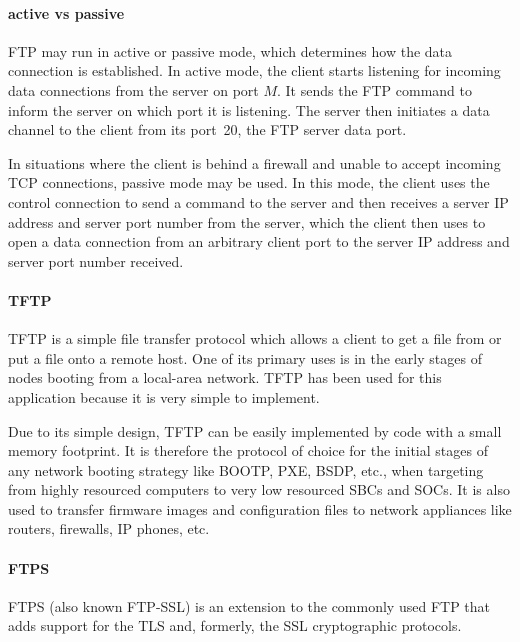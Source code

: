 \paragraph{active vs passive}
\acs{FTP} may run in active or passive mode, which determines how the data connection is established.
In active mode, the client starts listening for incoming data connections from the server on port $M$.
It sends the \acs{FTP} command  to inform the server on which port it is listening.
The server then initiates a data channel to the client from its port~20, the \acs{FTP} server data port.

In situations where the client is behind a firewall and unable to accept incoming \acs{TCP} connections, passive mode may be used.
In this mode, the client uses the control connection to send a  command to the server and then receives a server \acs{IP} address and server port number from the server, which the client then uses to open a data connection from an arbitrary client port to the server \acs{IP} address and server port number received.

\paragraph{\acs{TFTP}}
\acf{TFTP} is a simple file transfer protocol which allows a client to get a file from or put a file onto a remote host.
One of its primary uses is in the early stages of nodes booting from a local-area network.
\acs{TFTP} has been used for this application because it is very simple to implement.

Due to its simple design, \acs{TFTP} can be easily implemented by code with a small memory footprint.
It is therefore the protocol of choice for the initial stages of any network booting strategy like \acs{BOOTP}, \acs{PXE}, \acs{BSDP}, etc., when targeting from highly resourced computers to very low resourced \acp{SBC} and \acp{SOC}.
It is also used to transfer firmware images and configuration files to network appliances like routers, firewalls, \acs{IP} phones, etc.

\paragraph{\acs{FTPS}}
\ac{FTPS} (also known \acs{FTP}-\acs{SSL}) is an extension to the commonly used \acf{FTP} that adds support for the \acf{TLS} and, formerly, the \acf{SSL} cryptographic protocols.

